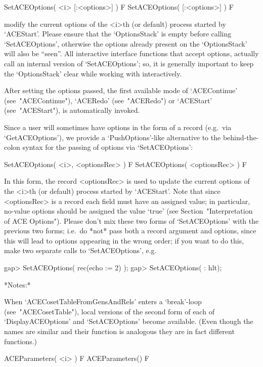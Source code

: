 \>SetACEOptions( <i> [:<options>] ) F
\>SetACEOptions( [:<options>] ) F

modify the current options of the <i>th (or default)  process  started
by `ACEStart'. Please ensure that the `OptionsStack' is  empty  before
calling `SetACEOptions', otherwise the options already present on  the
`OptionsStack' will also be ``seen''. All interactive {\ACE} interface
functions that accept options, actually call an  internal  version  of
`SetACEOptions';  so,  it  is  generally   important   to   keep   the
`OptionsStack' clear while working with {\ACE} interactively.

After  setting  the  options  passed,  the  first  available  mode  of
`ACEContinue'  (see~"ACEContinue"),   `ACERedo'   (see~"ACERedo")   or
`ACEStart' (see~"ACEStart"), is automatically invoked.

Since a user will sometimes have options  in  the  form  of  a  record
(e.g.~via   `GetACEOptions'),   we   provide   a    `PushOptions'-like
alternative to the behind-the-colon syntax for the passing of  options
via `SetACEOptions':

\>SetACEOptions( <i>, <optionsRec> ) F
\>SetACEOptions( <optionsRec> ) F

In this form, the record <optionsRec> is used to  update  the  current
options of the <i>th (or default) process started by `ACEStart'.  Note
that since <optionsRec> is a record each field must have  an  assigned
value; in particular, no-value {\ACE} options should be  assigned  the
value `true' (see Section~"Interpretation  of  ACE  Options").  Please
don't mix these two forms of `SetACEOptions'  with  the  previous  two
forms; i.e.~do *not* pass both a record argument  and  options,  since
this will lead to options appearing in the wrong order; if you want to
do this, make two separate calls to `SetACEOptions', e.g.

\beginexample
gap> SetACEOptions( rec(echo := 2) );
gap> SetACEOptions( : hlt);
\endexample

*Notes:*

When    `ACECosetTableFromGensAndRels'    enters    a     `break'-loop
(see~"ACECosetTable"), local versions of the second form  of  each  of
`DisplayACEOptions' and `SetACEOptions' become available. (Even though
the names are similar and their function is analogous they are in fact
different functions.)

\>ACEParameters( <i> ) F
\>ACEParameters() F

